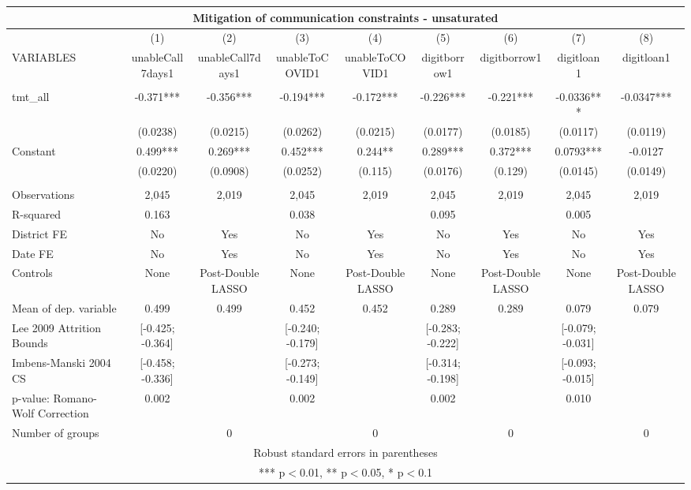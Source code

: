 \documentclass[]{article}
\begin{document}
\begin{tabular}{lcccccccc}
\multicolumn{9}{c}{Mitigation of communication constraints - unsaturated} \\ \hline
 & (1) & (2) & (3) & (4) & (5) & (6) & (7) & (8) \\
VARIABLES & unableCall7days1 & unableCall7days1 & unableToCOVID1 & unableToCOVID1 & digitborrow1 & digitborrow1 & digitloan1 & digitloan1 \\ \hline
 &  &  &  &  &  &  &  &  \\
tmt\_all & -0.371*** & -0.356*** & -0.194*** & -0.172*** & -0.226*** & -0.221*** & -0.0336*** & -0.0347*** \\
 & (0.0238) & (0.0215) & (0.0262) & (0.0215) & (0.0177) & (0.0185) & (0.0117) & (0.0119) \\
Constant & 0.499*** & 0.269*** & 0.452*** & 0.244** & 0.289*** & 0.372*** & 0.0793*** & -0.0127 \\
 & (0.0220) & (0.0908) & (0.0252) & (0.115) & (0.0176) & (0.129) & (0.0145) & (0.0149) \\
 &  &  &  &  &  &  &  &  \\
Observations & 2,045 & 2,019 & 2,045 & 2,019 & 2,045 & 2,019 & 2,045 & 2,019 \\
R-squared & 0.163 &  & 0.038 &  & 0.095 &  & 0.005 &  \\
District FE & No & Yes & No & Yes & No & Yes & No & Yes \\
Date FE & No & Yes & No & Yes & No & Yes & No & Yes \\
Controls & None & Post-Double LASSO & None & Post-Double LASSO & None & Post-Double LASSO & None & Post-Double LASSO \\
Mean of dep. variable & 0.499 & 0.499 & 0.452 & 0.452 & 0.289 & 0.289 & 0.079 & 0.079 \\
Lee 2009 Attrition Bounds & [-0.425; -0.364] &  & [-0.240; -0.179] &  & [-0.283; -0.222] &  & [-0.079; -0.031] &  \\
Imbens-Manski 2004 CS & [-0.458; -0.336] &  & [-0.273; -0.149] &  & [-0.314; -0.198] &  & [-0.093; -0.015] &  \\
p-value: Romano-Wolf Correction & 0.002 &  & 0.002 &  & 0.002 &  & 0.010 &  \\
 Number of groups &  & 0 &  & 0 &  & 0 &  & 0 \\ \hline
\multicolumn{9}{c}{ Robust standard errors in parentheses} \\
\multicolumn{9}{c}{ *** p$<$0.01, ** p$<$0.05, * p$<$0.1} \\
\end{tabular}
\end{document}
